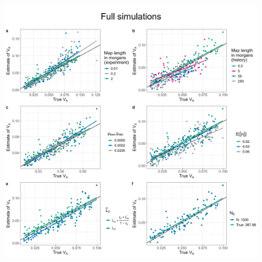 \documentclass[12pt]{article}
\providecommand{\DIFaddbeginFL}{} %
\providecommand{\DIFdelbeginFL}{} %
\providecommand{\DIFdelendFL}{} %
\newcommand{\DIFscaledelfig}{0.5}
\newlength{\DIFdelgraphicswidth} %
\newlength{\DIFdelgraphicsheight} %
\newcommand{\DIFaddincludegraphics}[2][]{{\color{blue}\fbox{\DIFOincludegraphics[#1]{#2}}}} %
\newcommand{\DIFdelincludegraphics}[2][]{%
\sbox{\DIFdelgraphicsbox}{\DIFOincludegraphics[#1]{#2}}%
\settoboxwidth{\DIFdelgraphicswidth}{\DIFdelgraphicsbox} %
\settoboxtotalheight{\DIFdelgraphicsheight}{\DIFdelgraphicsbox} %
\scalebox{\DIFscaledelfig}{%
\parbox[b]{\DIFdelgraphicswidth}{\usebox{\DIFdelgraphicsbox}\\[-\baselineskip] \rule{\DIFdelgraphicswidth}{0em}}\llap{\resizebox{\DIFdelgraphicswidth}{\DIFdelgraphicsheight}{%
\setlength{\unitlength}{\DIFdelgraphicswidth}%
\begin{picture}(1,1)%
\thicklines\linethickness{2pt} %
{\color[rgb]{1,0,0}\put(0,0){\framebox(1,1){}}}%
{\color[rgb]{1,0,0}\put(0,0){\line( 1,1){1}}}%
{\color[rgb]{1,0,0}\put(0,1){\line(1,-1){1}}}%
\end{picture}%
}\hspace*{3pt}}} %
} %
\DeclareRobustCommand{\DIFaddbeginFL}{\DIFOaddbeginFL \let\includegraphics\DIFaddincludegraphics} %
\DeclareRobustCommand{\DIFdelbeginFL}{\DIFOdelbeginFL \let\includegraphics\DIFdelincludegraphics} %
\DeclareRobustCommand{\DIFdelendFL}{\DIFOaddendFL \let\includegraphics\DIFOincludegraphics} %
\begin{document}
\begin{bibunit}
\begin{figure}[H]
\DIFdelbeginFL %
\DIFdelendFL \DIFaddbeginFL \includegraphics[scale = 0.12]{Figures/full_params.jpg}

\end{figure}
\end{bibunit}
\end{document}
